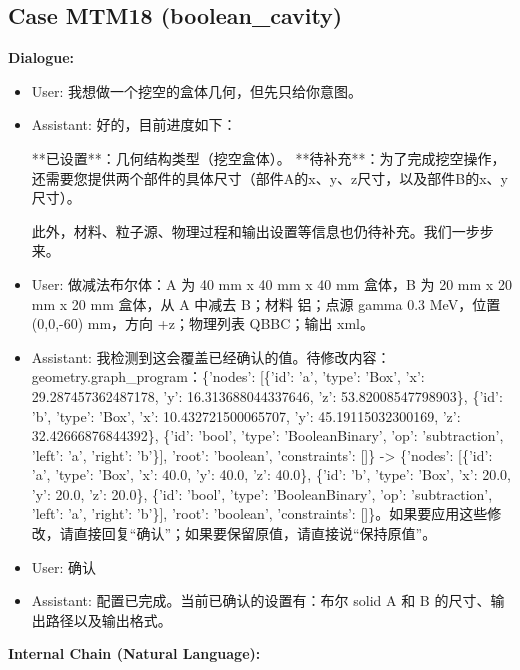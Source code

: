 \documentclass[11pt]{ctexart}
\begin{document}
\subsection{Case MTM18 (boolean\_cavity)}
\textbf{Dialogue:}
\begin{itemize}
\item User: 我想做一个挖空的盒体几何，但先只给你意图。
\item Assistant: 好的，目前进度如下：

**已设置**：几何结构类型（挖空盒体）。
**待补充**：为了完成挖空操作，还需要您提供两个部件的具体尺寸（部件A的x、y、z尺寸，以及部件B的x、y尺寸）。

此外，材料、粒子源、物理过程和输出设置等信息也仍待补充。我们一步步来。
\item User: 做减法布尔体：A 为 40 mm x 40 mm x 40 mm 盒体，B 为 20 mm x 20 mm x 20 mm 盒体，从 A 中减去 B；材料 铝；点源 gamma 0.3 MeV，位置 (0,0,-60) mm，方向 +z；物理列表 QBBC；输出 xml。
\item Assistant: 我检测到这会覆盖已经确认的值。待修改内容：geometry.graph\_program：\{'nodes': [\{'id': 'a', 'type': 'Box', 'x': 29.287457362487178, 'y': 16.313688044337646, 'z': 53.82008547798903\}, \{'id': 'b', 'type': 'Box', 'x': 10.432721500065707, 'y': 45.19115032300169, 'z': 32.42666876844392\}, \{'id': 'bool', 'type': 'BooleanBinary', 'op': 'subtraction', 'left': 'a', 'right': 'b'\}], 'root': 'boolean', 'constraints': []\} -> \{'nodes': [\{'id': 'a', 'type': 'Box', 'x': 40.0, 'y': 40.0, 'z': 40.0\}, \{'id': 'b', 'type': 'Box', 'x': 20.0, 'y': 20.0, 'z': 20.0\}, \{'id': 'bool', 'type': 'BooleanBinary', 'op': 'subtraction', 'left': 'a', 'right': 'b'\}], 'root': 'boolean', 'constraints': []\}。如果要应用这些修改，请直接回复“确认”；如果要保留原值，请直接说“保持原值”。
\item User: 确认
\item Assistant: 配置已完成。当前已确认的设置有：布尔 solid A 和 B 的尺寸、输出路径以及输出格式。
\end{itemize}
\textbf{Internal Chain (Natural Language):}
\end{document}
